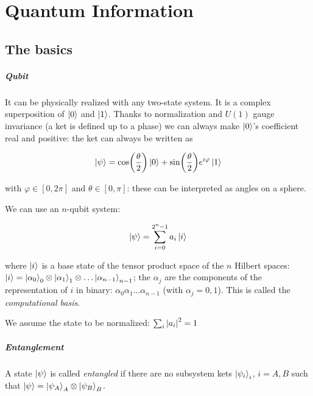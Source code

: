 \documentclass[main.tex]{subfiles}
\begin{document}
\chapter{Quantum Information}

\section{The basics}

\paragraph{Qubit}

It can be physically realized with any two-state system.
It is a complex superposition of \(\ket{0} \) and \(\ket{1} \). Thanks to normalization and \(U(1)\) gauge invariance (a ket is defined up to a phase) we can always make \(\ket{0} \)'s coefficient real and positive: the ket can always be written as

\begin{equation} \label{eq:qubit}
    \ket{\psi} = \cos(\frac{\theta}{2}) \ket{0} + \sin(\frac{\theta}{2}) e^{ i  \varphi} \ket{1}
\end{equation}

with \(\varphi \in [0,2 \pi]\) and \(\theta \in [0, \pi]\): these can be interpreted as angles on a sphere.

We can use an \(n\)-qubit system:

\begin{equation} \label{eq:n-qubit-state}
    \ket{\psi } = \sum _{i=0} ^{2^n-1} a_i \ket{i}
\end{equation}

where \(\ket{i} \) is a base state of the tensor product space of the \(n\) Hilbert spaces: \(\ket{i} = \ket{\alpha_0}_0 \otimes \ket{\alpha_1}_1 \otimes \dots \ket{\alpha_{n-1}}_{n-1} \); the \(\alpha_j\) are the components of the representation of \(i\) in binary: \(\alpha_0 \alpha_1 \dots \alpha_{n-1}\) (with \(\alpha_j =0,1\)). This is called the \emph{computational basis}.

We assume the state to be normalized: \(\sum _{i}  \abs{a_i} ^2 = 1 \)

\paragraph{Entanglement}

A state \(\ket{\psi } \) is called \emph{entangled} if there are no subsystem kets \(\ket{\psi _i} _i\), \(i = A, B\) such that \(\ket{\psi } = \ket{\psi _A} _A \otimes \ket{\psi _B} _B\).
\end{document}
